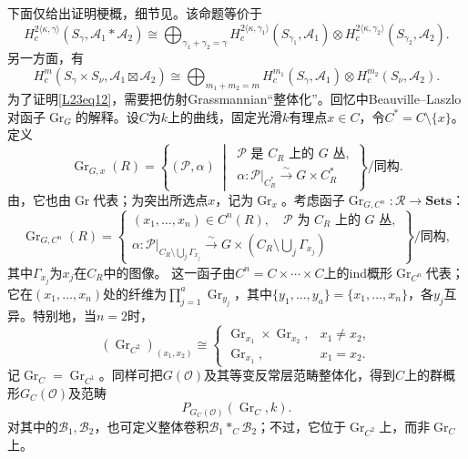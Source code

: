 下面仅给出证明梗概，细节见。该命题等价于
\begin{equation}\tag{1.2}\label{L23eq12}
H_c^{2\langle\kappa,\gamma\rangle}(S_\gamma,\mathcal A_1*\mathcal A_2)\cong\bigoplus_{\gamma_1+\gamma_2=\gamma}H_c^{2\langle\kappa,\gamma_1\rangle}(S_{\gamma_1},\mathcal A_1)\otimes H_c^{2\langle\kappa,\gamma_2\rangle}(S_{\gamma_2},\mathcal A_2).
\end{equation}
另一方面，有
\begin{equation}\tag{1.3}\label{L23eq13}H_c^m(S_\gamma\times S_\nu,\mathcal A_1\boxtimes\mathcal A_2)\cong\bigoplus_{m_1+m_2=m}H_c^{m_1}(S_\gamma,\mathcal A_1)\otimes H_c^{m_2}(S_\nu,\mathcal A_2).\end{equation}
为了证明\eqref{L23eq12}，需要把仿射Grassmannian“整体化”。回忆中Beauville–Laszlo对函子$\operatorname{Gr}_G$的解释。设$C$为$k$上的曲线，固定光滑$k$有理点$x\in C$，令$C^*=C\setminus\{x\}$。定义
\[\operatorname{Gr}_{G,x}(R)=\left\{(\mathcal P,\alpha)\ \middle|\ \begin{array}{l}\mathcal P\text{ 是 }C_R\text{ 上的 }G\text{ 丛},\\\alpha:\mathcal P|_{C^*_R}\xrightarrow{\sim}G\times C^*_R\end{array}\right\}\big/\text{同构}.\]
由，它也由$\operatorname{Gr}$代表；为突出所选点$x$，记为$\operatorname{Gr}_x$。考虑函子$\operatorname{Gr}_{G,C^n}:\mathcal R\to\mathbf{Sets}$：
\[\operatorname{Gr}_{G,C^n}(R)=\left\{\begin{array}{l}(x_1,\ldots,x_n)\in C^n(R),\quad\mathcal P\text{ 为 }C_R\text{ 上的 }G\text{ 丛},\\\alpha:\mathcal P|_{C_R\setminus\bigcup_j\Gamma_{x_j}}\xrightarrow{\sim}G\times(C_R\setminus\bigcup_j\Gamma_{x_j})\end{array}\right\}\big/\text{同构},\]
其中$\Gamma_{x_j}$为$x_j$在$C_R$中的图像。
这一函子由$C^n=C\times\cdots\times C$上的ind概形$\operatorname{Gr}_{C^n}$代表；它在$(x_1,\ldots,x_n)$处的纤维为$\prod_{j=1}^a\operatorname{Gr}_{y_j}$，其中$\{y_1,\ldots,y_a\}=\{x_1,\ldots,x_n\}$，各$y_j$互异。特别地，当$n=2$时，
\[(\operatorname{Gr}_{C^2})_{(x_1,x_2)}\cong\begin{cases}\operatorname{Gr}_{x_1}\times\operatorname{Gr}_{x_2},&x_1\ne x_2,\\\operatorname{Gr}_{x_1},&x_1=x_2.\end{cases}\]
记$\operatorname{Gr}_C=\operatorname{Gr}_{C^1}$。同样可把$G(\mathcal O)$及其等变反常层范畴整体化，得到$C$上的群概形$G_C(\mathcal O)$及范畴
\[P_{G_C(\mathcal O)}(\operatorname{Gr}_C,k).\]
对其中的$\mathcal B_1,\mathcal B_2$，也可定义整体卷积$\mathcal B_1*_C\mathcal B_2$；不过，它位于$\operatorname{Gr}_{C^2}$上，而非$\operatorname{Gr}_C$上。

